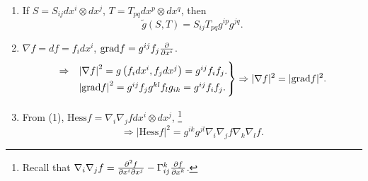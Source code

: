 \begin{example}
    \begin{enumerate}[(1)]
        \item If \(S=S_{ij}dx^i\otimes dx^j\), \(T=T_{pq}dx^p\otimes dx^q\),
        then
        \[
            \tilde{g}(S,T)=S_{ij}T_{pq}g^{ip}g^{jq}.    
        \]
        \item \(\nabla f= df =f_i d x^i\),
        \(\mathrm{grad} f= g^{ij} f_j \pdv{x^i}\).
        \[
            \begin{rcases}
                \Rightarrow &\left|\nabla f\right|^2 =
                g\left(f_i dx^i,f_j dx^j\right)=g^{ij} f_i f_j.\\
                &\left|\mathrm{grad} f\right|^2= g^{ij} f_j g^{kl}f_l g_{ik}
                =g^{ij}f_i f_j.
            \end{rcases}
            \Rightarrow
            |\nabla f|^2=|\mathrm{grad} f|^2.  
        \]
        \item From (1), \(\mathrm{Hess} f =\nabla_i\nabla_j f dx^i\otimes
        d x^j\),
        \footnote{Recall that \(\nabla_i\nabla_j f=\pdv{f}{x^i}{x^j}
        -\Gamma\indices*{_{ij}^k}\pdv{f}{x^k}\).}
        \[\Rightarrow |\mathrm{Hess} f|^2= g^{ik}g^{jl}\nabla_i\nabla_j f
        \nabla_k\nabla_l f.\]
    \end{enumerate}
\end{example}
